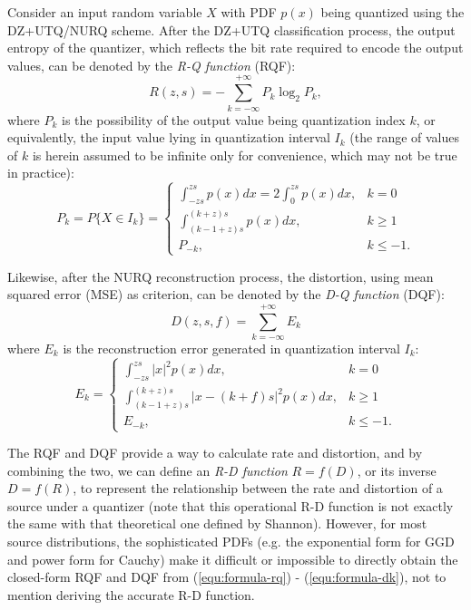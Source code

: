 \documentclass[smallabstract,smallcaptions]{dccpaper}
\begin{document}
Consider an input random variable $X$ with PDF $p(x)$ being quantized using the DZ+UTQ/NURQ scheme. After the DZ+UTQ classification process, the output entropy of the quantizer, which reflects the bit rate required to encode the output values, can be denoted by the \emph{R-Q function} (RQF):
\begin{equation}\label{equ:formula-rq}
	R(z, s) = -\sum_{k=-\infty}^{+\infty} P_k \log_2 P_k ,
\end{equation}
where $P_k$ is the possibility of the output value being quantization index $k$, or equivalently, the input value lying in quantization interval $I_{k}$ (the range of values of $k$ is herein assumed to be infinite only for convenience, which may not be true in practice):
{\small
\begin{equation}\label{equ:formula-pk}
	P_k = P\{X \in I_k\} =
	\begin{cases}
		\int_{-z s}^{z s} p(x) dx
		= 2 \int_{0}^{z s} p(x) dx,
		& k=0 \\
		\int_{(k-1+z) s}^{(k+z) s} p(x) dx,
		& k \ge 1 \\
		P_{-k},
		& k \le -1 .
	\end{cases}
\end{equation}  
}

Likewise, after the NURQ reconstruction process, the distortion, using mean squared error (MSE) as criterion, can be denoted by the \emph{D-Q function} (DQF):
\begin{equation}\label{equ:formula-dq}
	D(z, s, f) =\sum_{k=-\infty}^{+\infty} E_k
\end{equation}
where $E_k$ is the reconstruction error generated in quantization interval $I_k$:
\begin{equation}\label{equ:formula-dk}
	E_k=
	\begin{cases}
		\int_{-z s}^{z s} |x|^2 p(x) dx,
		& k=0 \\
		\int_{(k-1+z) s}^{(k+z) s} |x - (k+f) s|^2 p(x) dx,
		& k \ge 1 \\
		E_{-k},
		& k \le -1 .
	\end{cases}
\end{equation}

The RQF and DQF provide a way to calculate rate and distortion, and by combining the two, we can define an \emph{R-D function} $R=f(D)$, or its inverse $D=f(R)$, to represent the relationship between the rate and distortion of a source under a quantizer (note that this operational R-D function is not exactly the same with that theoretical one defined by Shannon). However, for most source distributions, the sophisticated PDFs (e.g. the exponential form for GGD and power form for Cauchy) make it difficult or impossible to directly obtain the closed-form RQF and DQF from (\ref{equ:formula-rq}) - (\ref{equ:formula-dk}), not to mention deriving the accurate R-D function.
\end{document}
